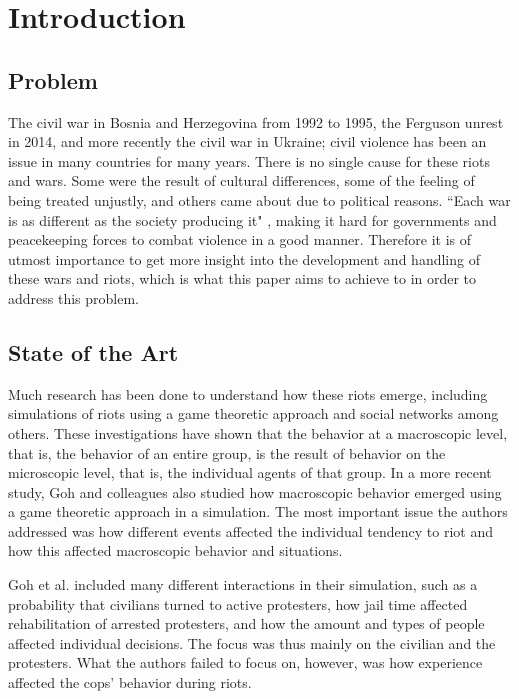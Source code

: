 \section{Introduction}
\subsection{Problem}
The civil war in Bosnia and Herzegovina from 1992 to 1995, the Ferguson unrest in 2014, and more recently the civil war in Ukraine; civil violence has been an issue in many countries for many years.
There is no single cause for these riots and wars.
Some were the result of cultural differences, some of the feeling of being treated unjustly, and others came about due to political reasons.
``Each war is as different as the society producing it" \citep*{sambanis2001ethnic}, making it hard for governments and peacekeeping forces to combat violence in a good manner. Therefore it is of utmost importance to get more insight into the development and handling of these wars and riots, which is what this paper aims to achieve to in order to address this problem.

\subsection{State of the Art}
Much research has been done to understand how these riots emerge, including simulations of riots using a game theoretic approach \citep*{myerson1991game} and social networks \citep*{gulden2002spatial} among others.
These investigations have shown that the behavior at a macroscopic level, that is, the behavior of an entire group, is the result of behavior on the microscopic level, that is, the individual agents of that group.
In a more recent study, Goh and colleagues \citep*{goh2006modeling} also studied how macroscopic behavior emerged using a game theoretic approach in a simulation.
The most important issue the authors addressed was how different events affected the individual tendency to riot and how this affected macroscopic behavior and situations.


Goh et al. included many different interactions in their simulation, such as a probability that civilians turned to active protesters, how jail time affected rehabilitation of arrested protesters, and how the amount and types of people affected individual decisions. The focus was thus mainly on the civilian and the protesters. What the authors failed to focus on, however, was how experience affected the cops' behavior during riots.

